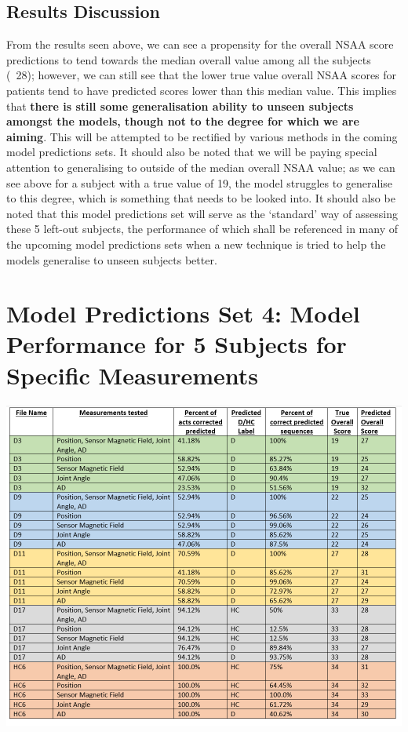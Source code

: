 \documentclass[12pt,twoside]{report}
\begin{document}
\subsection{Results Discussion}

\quad From the results seen above, we can see a propensity for the overall NSAA score predictions to tend towards the median overall value among all the subjects (~28); however, we can still see that the lower true value overall NSAA scores for patients tend to have predicted scores lower than this median value. This implies that \textbf{there is still some generalisation ability to unseen subjects amongst the models, though not to the degree for which we are aiming}. This will be attempted to be rectified by various methods in the coming model predictions sets. It should also be noted that we will be paying special attention to generalising to outside of the median overall NSAA value; as we can see above for a subject with a true value of 19, the model struggles to generalise to this degree, which is something that needs to be looked into. It should also be noted that this model predictions set will serve as the ‘standard’ way of assessing these 5 left-out subjects, the performance of which shall be referenced in many of the upcoming model predictions sets when a new technique is tried to help the models generalise to unseen subjects better.


\section{Model Predictions Set 4: Model Performance for 5 Subjects for Specific Measurements}

\begin{center}
\includegraphics[scale=0.45]{project_figures/fig11_6}
\end{center}
\end{document}
